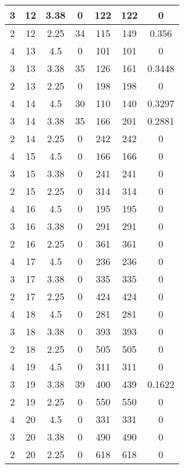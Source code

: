 \documentclass[letterpaper, 12pt]{article}
\begin{document}
\begin{longtable}{|c|c|c|c|c|c|c|}
\hline
3 & 12 & 3.38 & 0 & 122 & 122 & 0 \\
\hline
2 & 12 & 2.25 & 34 & 115 & 149 & 0.356 \\
\hline
4 & 13 & 4.5 & 0 & 101 & 101 & 0 \\
\hline
3 & 13 & 3.38 & 35 & 126 & 161 & 0.3448 \\
\hline
2 & 13 & 2.25 & 0 & 198 & 198 & 0 \\
\hline
4 & 14 & 4.5 & 30 & 110 & 140 & 0.3297 \\
\hline
3 & 14 & 3.38 & 35 & 166 & 201 & 0.2881 \\
\hline
2 & 14 & 2.25 & 0 & 242 & 242 & 0 \\
\hline
4 & 15 & 4.5 & 0 & 166 & 166 & 0 \\
\hline
3 & 15 & 3.38 & 0 & 241 & 241 & 0 \\
\hline
2 & 15 & 2.25 & 0 & 314 & 314 & 0 \\
\hline
4 & 16 & 4.5 & 0 & 195 & 195 & 0 \\
\hline
3 & 16 & 3.38 & 0 & 291 & 291 & 0 \\
\hline
2 & 16 & 2.25 & 0 & 361 & 361 & 0 \\
\hline
4 & 17 & 4.5 & 0 & 236 & 236 & 0 \\
\hline
3 & 17 & 3.38 & 0 & 335 & 335 & 0 \\
\hline
2 & 17 & 2.25 & 0 & 424 & 424 & 0 \\
\hline
4 & 18 & 4.5 & 0 & 281 & 281 & 0 \\
\hline
3 & 18 & 3.38 & 0 & 393 & 393 & 0 \\
\hline
2 & 18 & 2.25 & 0 & 505 & 505 & 0 \\
\hline
4 & 19 & 4.5 & 0 & 311 & 311 & 0 \\
\hline
3 & 19 & 3.38 & 39 & 400 & 439 & 0.1622 \\
\hline
2 & 19 & 2.25 & 0 & 550 & 550 & 0 \\
\hline
4 & 20 & 4.5 & 0 & 331 & 331 & 0 \\
\hline
3 & 20 & 3.38 & 0 & 490 & 490 & 0 \\
\hline
2 & 20 & 2.25 & 0 & 618 & 618 & 0 \\
\hline
\end{longtable}
\end{document}

